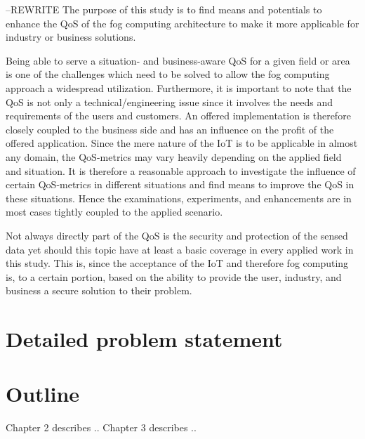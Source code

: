--REWRITE
The purpose of this study is to find means and potentials to enhance the QoS of the fog computing architecture to make it more applicable for industry or business solutions. 

Being able to serve a situation- and business-aware QoS for a given field or area is one of the challenges which need to be solved to allow the fog computing approach a widespread utilization. Furthermore, it is important to note that the QoS is not only a technical/engineering issue since it involves the needs and requirements of the users and customers. An offered implementation is therefore closely coupled to the business side and has an influence on the profit of the offered application. 
Since the mere nature of the IoT is to be applicable in almost any domain, the QoS-metrics may vary heavily depending on the applied field and situation. It is therefore a reasonable approach to investigate the influence of certain QoS-metrics in different situations and find means to improve the QoS in these situations. Hence the examinations, experiments, and enhancements are in most cases tightly coupled to the applied scenario. 

Not always directly part of the QoS is the security and protection of the sensed data yet should this topic have at least a basic coverage in every applied work in this study. This is, since the acceptance of the IoT and therefore fog computing is, to a certain portion, based on the ability to provide the user, industry, and business a secure solution to their problem. 


\section{Detailed problem statement}
\label{sec:problemstatement}



\section{Outline}
\label{ch:disposition}
Chapter 2 describes ..
Chapter 3 describes ..

\fi






\iffalse
